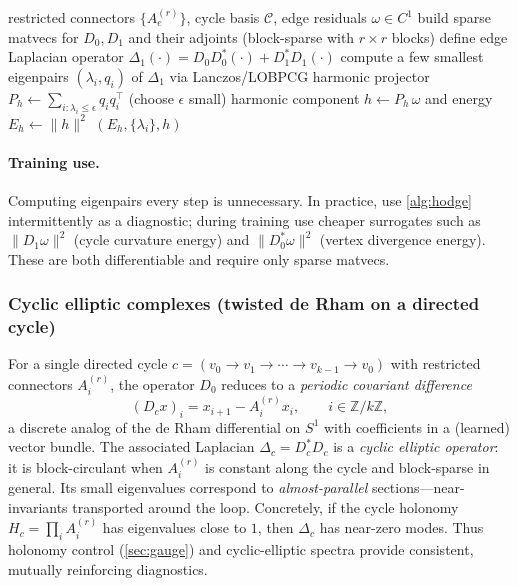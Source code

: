 \documentclass[11pt]{article}
\theoremstyle{definition}
\theoremstyle{plain}
\theoremstyle{remark}
\newcommand{\mc}[1]{\mathcal{#1}}
\newcommand{\bb}[1]{\mathbb{#1}}
\begin{document}
\begin{algorithm}[t]
\caption{Hodge diagnostics on a cycle basis (edge-space harmonic energy)}
\label{alg:hodge}
\begin{algorithmic}[1]
\Require restricted connectors $\{A_e^{(r)}\}$, cycle basis $\mc{C}$, edge residuals $\omega\in C^1$
\State build sparse matvecs for $D_0,D_1$ and their adjoints (block-sparse with $r\times r$ blocks)
\State define edge Laplacian operator $\Delta_1(\cdot)=D_0D_0^\ast(\cdot)+D_1^\ast D_1(\cdot)$
\State compute a few smallest eigenpairs $(\lambda_i, q_i)$ of $\Delta_1$ via Lanczos/LOBPCG
\State harmonic projector $P_h \gets \sum_{i:\lambda_i\le \epsilon} q_i q_i^\top$ (choose $\epsilon$ small)
\State harmonic component $h \gets P_h\,\omega$ and energy $E_h\gets \|h\|^2$
\State \Return $(E_h,\{\lambda_i\},h)$
\end{algorithmic}
\end{algorithm}

\paragraph{Training use.}
Computing eigenpairs every step is unnecessary.
In practice, use \cref{alg:hodge} intermittently as a diagnostic; during training use cheaper surrogates such as $\|D_1\omega\|^2$ (cycle curvature energy) and $\|D_0^\ast\omega\|^2$ (vertex divergence energy).
These are both differentiable and require only sparse matvecs.

\subsubsection{Cyclic elliptic complexes (twisted de Rham on a directed cycle)}
For a single directed cycle $c=(v_0\to v_1\to\cdots\to v_{k-1}\to v_0)$ with restricted connectors $A_i^{(r)}$, the operator $D_0$ reduces to a \emph{periodic covariant difference}
\[
(D_c x)_i = x_{i+1} - A_i^{(r)} x_i,\qquad i\in\bb{Z}/k\bb{Z},
\]
a discrete analog of the de Rham differential on $S^1$ with coefficients in a (learned) vector bundle.
The associated Laplacian $\Delta_c=D_c^\ast D_c$ is a \emph{cyclic elliptic operator}: it is block-circulant when $A_i^{(r)}$ is constant along the cycle and block-sparse in general.
Its small eigenvalues correspond to \emph{almost-parallel} sections---near-invariants transported around the loop.
Concretely, if the cycle holonomy $H_c=\prod_i A_i^{(r)}$ has eigenvalues close to $1$, then $\Delta_c$ has near-zero modes.
Thus holonomy control (\cref{sec:gauge}) and cyclic-elliptic spectra provide consistent, mutually reinforcing diagnostics.
\end{document}
